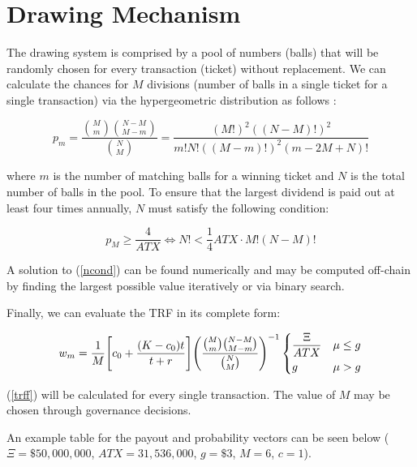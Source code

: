 \section{Drawing Mechanism}

The drawing system is comprised by a pool of numbers (balls) that will be randomly chosen for every transaction (ticket) without replacement. We can calculate the chances for $M$ divisions (number of balls in a single ticket for a single transaction) via the hypergeometric distribution as follows \cite{feller}:

\begin{equation}
    p_m = \frac{\binom{M}{m}\binom{N-M}{M-m}}{\binom{N}{M}} = \frac{(M!)^2((N-M)!)^2}{m!N!((M-m)!)^2(m-2M+N)!}
\end{equation}

where $m$ is the number of matching balls for a winning ticket and $N$ is the total number of balls in the pool. To ensure that the largest dividend is paid out at least four times annually, $N$ must satisfy the following condition:

\begin{equation} \label{ncond}
    p_M \geq \frac{4}{ATX} \Leftrightarrow N! < \frac{1}{4} ATX \cdot M! (N-M)!
\end{equation}

A solution to (\ref{ncond}) can be found numerically and may be computed off-chain by finding the largest possible value iteratively or via binary search.

Finally, we can evaluate the TRF in its complete form:

\begin{equation} \label{trff}
    w_m = \frac{1}{M} \Bigg[c_0 + \frac{(K-c_0)t}{t+r}\Bigg] \Bigg(\frac{\binom{M}{m}\binom{N-M}{M-m}}{\binom{N}{M}}\Bigg)^{-1} 
    \begin{dcases}
    \frac{\Xi}{ATX} & \mu \leq g \\
    g & \mu > g
    \end{dcases}
\end{equation}

(\ref{trff}) will be calculated for every single transaction. The value of $M$ may be chosen through governance decisions.

An example table for the payout and probability vectors can be seen below ($\Xi = \$50,000,000$, $ATX = 31,536,000$, $g = \$3$, $M=6$, $c = 1$).


